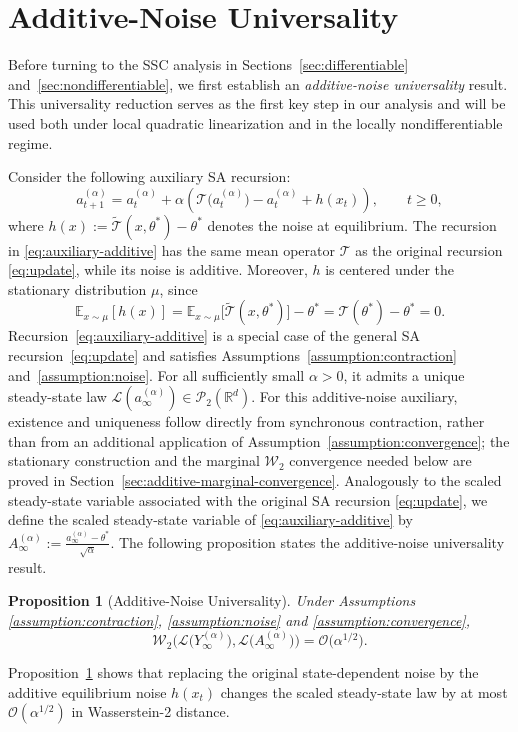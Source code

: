 \documentclass[11pt,letterpaper]{article}
\theoremstyle{plain}
\newtheorem{proposition}{Proposition}
\theoremstyle{definition}
\theoremstyle{remark}
\newcommand{\mT}{\mathcal{T}}
\newcommand{\W}{\mathcal{W}}
\newcommand{\tmT}{\widetilde{\mT}}
\newcommand{\law}{\mathcal{L}}
\begin{document}
\section{Additive-Noise Universality}\label{sec:additive}
Before turning to the SSC analysis in
Sections~\ref{sec:differentiable} and~\ref{sec:nondifferentiable}, we first
establish an \emph{additive-noise universality} result. This universality
reduction serves as the first key step in our analysis and will be used
both under local quadratic linearization and in the locally nondifferentiable
regime.

Consider the following auxiliary SA recursion:
\begin{equation}\label{eq:auxiliary-additive}
a_{t+1}^{(\alpha)}
=
a_t^{(\alpha)}
+
\alpha\left(
\mT\big(a_t^{(\alpha)}\big)
-
a_t^{(\alpha)}
+
h(x_t)
\right),
\qquad t\geq 0,
\end{equation}
where $h(x)
:=
\tmT(x,\theta^*)-\theta^*$ denotes the noise at equilibrium. The recursion in \eqref{eq:auxiliary-additive} has the same mean operator
\(\mT\) as the original recursion \eqref{eq:update}, while its noise is additive. Moreover, \(h\) is centered under the stationary
distribution \(\mu\), since
\[
\mathbb E_{x\sim\mu}[h(x)]
=
\mathbb E_{x\sim\mu}\big[\tmT(x,\theta^*)\big]-\theta^*
=
\mT(\theta^*)-\theta^*
=
0 .
\]
Recursion~\eqref{eq:auxiliary-additive} is a special case of the general SA
recursion~\eqref{eq:update} and satisfies
Assumptions~\ref{assumption:contraction} and~\ref{assumption:noise}.
For all sufficiently small $\alpha>0$, it admits a unique steady-state
law $\law(a_\infty^{(\alpha)})\in\mathcal P_2(\mathbb R^d)$. For this
additive-noise auxiliary, existence and uniqueness follow directly from
synchronous contraction, rather than from an additional application of
Assumption~\ref{assumption:convergence}; the stationary construction and
the marginal $\W_2$ convergence needed below are proved in
Section~\ref{sec:additive-marginal-convergence}.
Analogously to the scaled steady-state variable associated with the original
SA recursion \eqref{eq:update}, we
define the scaled steady-state variable of  \eqref{eq:auxiliary-additive} by $A_\infty^{(\alpha)}
:=
\frac{a_\infty^{(\alpha)}-\theta^*}{\sqrt{\alpha}} .$ The following proposition states the additive-noise universality result.
\begin{proposition}[Additive-Noise Universality]\label{prop:additive}
Under Assumptions \ref{assumption:contraction}, \ref{assumption:noise} and \ref{assumption:convergence}, 
\[
\W_2\Big(
\law\big(Y_\infty^{(\alpha)}\big),
\law\big(A_\infty^{(\alpha)}\big)
\Big)
=
\mathcal O\big(\alpha^{1/2}\big).
\]
\end{proposition}
Proposition~\ref{prop:additive} shows that replacing the original
state-dependent noise by the additive  equilibrium noise \(h(x_t)\) changes the scaled
steady-state law by at most
\(\mathcal{O}(\alpha^{1/2})\) in Wasserstein-2 distance. 
\end{document}
